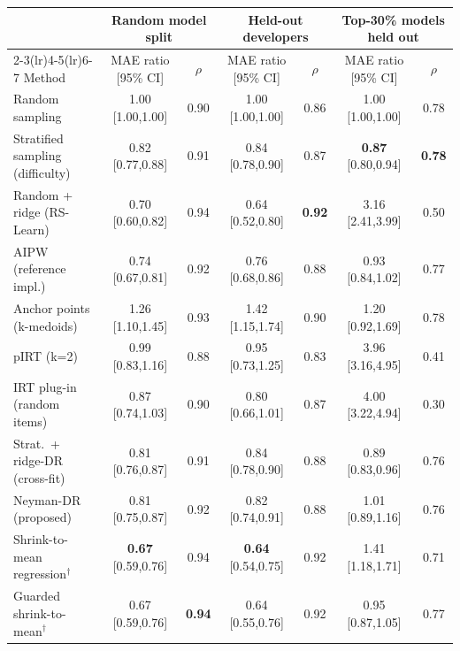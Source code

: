 \begin{tabular}{l cc cc cc}
\toprule
 & \multicolumn{2}{c}{Random model split} & \multicolumn{2}{c}{Held-out developers} & \multicolumn{2}{c}{Top-30\% models held out}\\
\cmidrule(lr){2-3}\cmidrule(lr){4-5}\cmidrule(lr){6-7}
Method & MAE ratio [95\% CI] & $\rho$ & MAE ratio [95\% CI] & $\rho$ & MAE ratio [95\% CI] & $\rho$ \\
\midrule
Random sampling & 1.00 {\scriptsize[1.00,1.00]} & 0.90 & 1.00 {\scriptsize[1.00,1.00]} & 0.86 & 1.00 {\scriptsize[1.00,1.00]} & 0.78 \\
Stratified sampling (difficulty) & 0.82 {\scriptsize[0.77,0.88]} & 0.91 & 0.84 {\scriptsize[0.78,0.90]} & 0.87 & \textbf{0.87} {\scriptsize[0.80,0.94]} & \textbf{0.78} \\
Random + ridge (RS-Learn) & 0.70 {\scriptsize[0.60,0.82]} & 0.94 & 0.64 {\scriptsize[0.52,0.80]} & \textbf{0.92} & 3.16 {\scriptsize[2.41,3.99]} & 0.50 \\
AIPW (reference impl.) & 0.74 {\scriptsize[0.67,0.81]} & 0.92 & 0.76 {\scriptsize[0.68,0.86]} & 0.88 & 0.93 {\scriptsize[0.84,1.02]} & 0.77 \\
Anchor points (k-medoids) & 1.26 {\scriptsize[1.10,1.45]} & 0.93 & 1.42 {\scriptsize[1.15,1.74]} & 0.90 & 1.20 {\scriptsize[0.92,1.69]} & 0.78 \\
pIRT (k=2) & 0.99 {\scriptsize[0.83,1.16]} & 0.88 & 0.95 {\scriptsize[0.73,1.25]} & 0.83 & 3.96 {\scriptsize[3.16,4.95]} & 0.41 \\
IRT plug-in (random items) & 0.87 {\scriptsize[0.74,1.03]} & 0.90 & 0.80 {\scriptsize[0.66,1.01]} & 0.87 & 4.00 {\scriptsize[3.22,4.94]} & 0.30 \\
Strat.\ + ridge-DR (cross-fit) & 0.81 {\scriptsize[0.76,0.87]} & 0.91 & 0.84 {\scriptsize[0.78,0.90]} & 0.88 & 0.89 {\scriptsize[0.83,0.96]} & 0.76 \\
Neyman-DR (proposed) & 0.81 {\scriptsize[0.75,0.87]} & 0.92 & 0.82 {\scriptsize[0.74,0.91]} & 0.88 & 1.01 {\scriptsize[0.89,1.16]} & 0.76 \\
Shrink-to-mean regression$^\dagger$ & \textbf{0.67} {\scriptsize[0.59,0.76]} & 0.94 & \textbf{0.64} {\scriptsize[0.54,0.75]} & 0.92 & 1.41 {\scriptsize[1.18,1.71]} & 0.71 \\
Guarded shrink-to-mean$^\dagger$ & 0.67 {\scriptsize[0.59,0.76]} & \textbf{0.94} & 0.64 {\scriptsize[0.55,0.76]} & 0.92 & 0.95 {\scriptsize[0.87,1.05]} & 0.77 \\
\bottomrule
\end{tabular}
